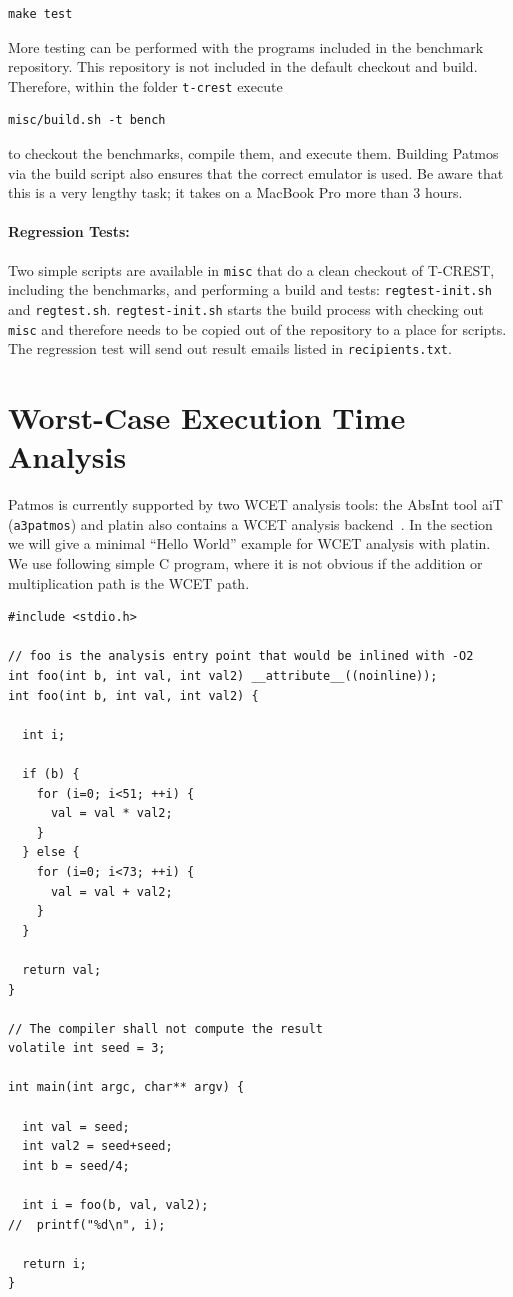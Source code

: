 \documentclass[a4paper,fontsize=10pt,twoside,DIV15,BCOR12mm,headinclude=true,footinclude=false,pagesize,bibtotoc]{scrbook}
\newcommand{\code}[1]{{\texttt{#1}}}
\begin{document}
\begin{verbatim}
make test
\end{verbatim}

More testing can be performed with the programs included in the benchmark repository.
This repository is not included in the default checkout and build. Therefore, within the
folder \code{t-crest} execute

\begin{verbatim}
misc/build.sh -t bench
\end{verbatim}

to checkout the benchmarks, compile them, and execute them. Building Patmos via the build script
also ensures that the correct emulator is used. Be aware that this is
a very lengthy task; it takes on a MacBook Pro more than 3 hours.

\paragraph{Regression Tests:} Two simple scripts are available in \code{misc} that do
a clean checkout of T-CREST, including the benchmarks, and performing a build
and tests: \code{regtest-init.sh} and \code{regtest.sh}. \code{regtest-init.sh} starts
the build process with checking out \code{misc} and therefore needs to
be copied out of the repository to a place for scripts. The regression test will
send out result emails listed in \code{recipients.txt}.

\section{Worst-Case Execution Time Analysis}

Patmos is currently supported by two WCET analysis tools:
the AbsInt tool aiT~\cite{aiT} (\code{a3patmos}) and platin also contains
a WCET analysis backend~\cite{compiler:platin:kps15}.
In the section we will give a minimal ``Hello World'' example for WCET analysis
with platin. We use following simple C program, where it is not obvious if the
addition or multiplication path is the WCET path.

\begin{verbatim}
#include <stdio.h>

// foo is the analysis entry point that would be inlined with -O2
int foo(int b, int val, int val2) __attribute__((noinline));
int foo(int b, int val, int val2) {

  int i;

  if (b) {
    for (i=0; i<51; ++i) {
      val = val * val2;
    }
  } else {
    for (i=0; i<73; ++i) {
      val = val + val2;
    }
  }

  return val;
}

// The compiler shall not compute the result
volatile int seed = 3;

int main(int argc, char** argv) {

  int val = seed;
  int val2 = seed+seed;
  int b = seed/4;

  int i = foo(b, val, val2);
//  printf("%d\n", i);

  return i;
}
\end{verbatim}
\end{document}
